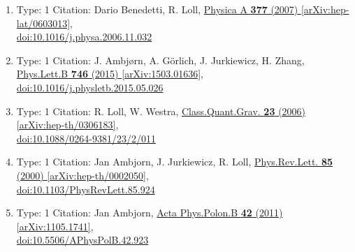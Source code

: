 \documentclass[a4paper,10pt]{article}
\begin{document}
\begin{enumerate}
\begin{enumerate}
  \item Type: 1 Citation: Dario Benedetti, R. Loll, \href{https://www.doi.org/10.1016/j.physa.2006.11.032}{Physica A {\bf 377} (2007) }  \href{https://arxiv.org/abs/hep-lat/0603013}{[arXiv:hep-lat/0603013]},\\\href{https://www.doi.org/10.1016/j.physa.2006.11.032}{doi:10.1016/j.physa.2006.11.032}
  \item Type: 1 Citation: J. Ambjørn, A. Görlich, J. Jurkiewicz, H. Zhang, \href{https://www.doi.org/10.1016/j.physletb.2015.05.026}{Phys.Lett.B {\bf 746} (2015) }  \href{https://arxiv.org/abs/1503.01636}{[arXiv:1503.01636]},\\\href{https://www.doi.org/10.1016/j.physletb.2015.05.026}{doi:10.1016/j.physletb.2015.05.026}
  \item Type: 1 Citation: R. Loll, W. Westra, \href{https://www.doi.org/10.1088/0264-9381/23/2/011}{Class.Quant.Grav. {\bf 23} (2006) }  \href{https://arxiv.org/abs/hep-th/0306183}{[arXiv:hep-th/0306183]},\\\href{https://www.doi.org/10.1088/0264-9381/23/2/011}{doi:10.1088/0264-9381/23/2/011}
  \item Type: 1 Citation: Jan Ambjorn, J. Jurkiewicz, R. Loll, \href{https://www.doi.org/10.1103/PhysRevLett.85.924}{Phys.Rev.Lett. {\bf 85} (2000) }  \href{https://arxiv.org/abs/hep-th/0002050}{[arXiv:hep-th/0002050]},\\\href{https://www.doi.org/10.1103/PhysRevLett.85.924}{doi:10.1103/PhysRevLett.85.924}
  \item Type: 1 Citation: Jan Ambjorn, \href{https://www.doi.org/10.5506/APhysPolB.42.923}{Acta Phys.Polon.B {\bf 42} (2011) }  \href{https://arxiv.org/abs/1105.1741}{[arXiv:1105.1741]},\\\href{https://www.doi.org/10.5506/APhysPolB.42.923}{doi:10.5506/APhysPolB.42.923}

\end{enumerate}
\end{enumerate}
\end{document}
